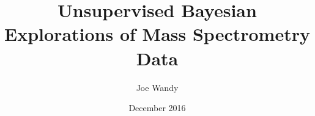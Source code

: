 \documentclass[oneside]{glasgowthesis}
\begin{document}
\pagestyle{empty}

\title{\fontsize{22}{35}\selectfont Unsupervised Bayesian Explorations of Mass Spectrometry Data}
\author{Joe Wandy}
\date{December 2016}

\maketitle

\newpage

 

\newpage
 









\tableofcontents
\listoftables
\listoffigures

\newpage
\pagestyle{fancy}
\setcounter{page}{1}

\let\cleardoublepage\clearpage
\end{document}
